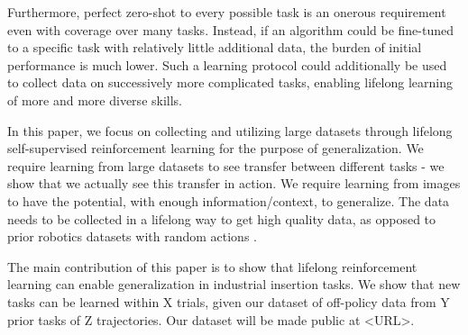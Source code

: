 Furthermore, perfect zero-shot to every possible task is an onerous requirement even with coverage over many tasks.
Instead, if an algorithm could be fine-tuned to a specific task with relatively little additional data, the burden of initial performance is much lower.
Such a learning protocol could additionally be used to collect data on successively more complicated tasks, enabling lifelong learning of more and more diverse skills.

In this paper, we focus on collecting and utilizing large datasets through lifelong self-supervised reinforcement learning for the purpose of generalization.
We require learning from large datasets to see transfer between different tasks - we show that we actually see this transfer in action.
We require learning from images to have the potential, with enough information/context, to generalize.
The data needs to be collected in a lifelong way to get high quality data, as opposed to prior robotics datasets with random actions \cite{dasari2019robonet}.

The main contribution of this paper is to show that lifelong reinforcement learning can enable generalization in industrial insertion tasks.
We show that new tasks can be learned within X trials, given our dataset of off-policy data from Y prior tasks of Z trajectories.
Our dataset will be made public at <URL>.
